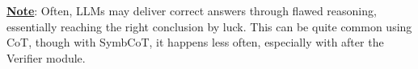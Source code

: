 \documentclass[10pt,a4paper]{article}
\begin{document}
\begin{multicols}{2}
\underline{\textbf{Note}}: Often, LLMs may deliver correct answers through flawed reasoning, essentially reaching the right conclusion by luck. This can be quite common using CoT, though with SymbCoT, it happens less often, especially with after the Verifier module. 




\end{multicols} %
\end{document}
